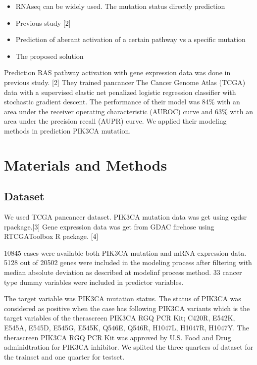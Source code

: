 \documentclass[10pt,letterpaper]{article}
\begin{document}
\begin{itemize}
\item
  RNAseq can be widely used. The mutation status directly prediction
\item
  Previous study {[}2{]}
\item
  Prediction of aberant activation of a certain pathway vs a specific
  mutation
\item
  The proposed solution
\end{itemize}

Prediction RAS pathway activation with gene expression data was done in
previous study. {[}2{]} They trained pancancer The Cancer Genome Atlas
(TCGA) data with a supervised elastic net penalized logistic regression
classifier with stochastic gradient descent. The performance of their
model was 84\% with an area under the receiver operating characteristic
(AUROC) curve and 63\% with an area under the precision recall (AUPR)
curve. We applied their modeling methods in prediction PIK3CA mutation.

\hypertarget{materials-and-methods}{%
\section{Materials and Methods}\label{materials-and-methods}}

\hypertarget{dataset}{%
\subsection{Dataset}\label{dataset}}

We used TCGA pancancer dataset. PIK3CA mutation data was get using cgdsr
rpackage.{[}3{]} Gene expression data was get from GDAC firehose using
RTCGAToolbox R package. {[}4{]}

10845 cases were available both PIK3CA mutation and mRNA expression
data. 5128 out of 20502 genes were included in the modeling process
after filtering with median absolute deviation as described at modelinf
process method. 33 cancer type dummy variables were included in
predictor variables.

The target variable was PIK3CA mutation status. The status of PIK3CA was
considered as positive when the case has following PIK3CA variants which
is the target variables of the therascreen PIK3CA RGQ PCR Kit; C420R,
E542K, E545A, E545D, E545G, E545K, Q546E, Q546R, H1047L, H1047R, H1047Y.
The therascreen PIK3CA RGQ PCR Kit was approved by U.S. Food and Drug
adminidtration for PIK3CA inhibitor. We splited the three quarters of
dataset for the trainset and one quarter for testset.
\end{document}
